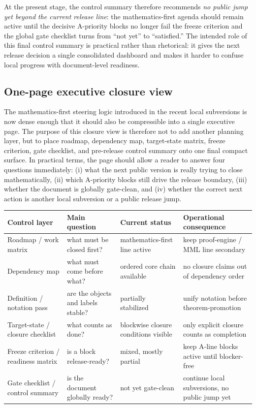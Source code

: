 At the present stage, the control summary therefore recommends \emph{no public jump yet beyond the current release line}: the mathematics-first agenda should remain active until the decisive A-priority blocks no longer fail the freeze criterion and the global gate checklist turns from ``not yet'' to ``satisfied.'' The intended role of this final control summary is practical rather than rhetorical: it gives the next release decision a single consolidated dashboard and makes it harder to confuse local progress with document-level readiness.


\subsection*{One-page executive closure view}
The mathematics-first steering logic introduced in the recent local subversions is now dense enough that it should also be compressible into a single executive page. The purpose of this closure view is therefore not to add another planning layer, but to place roadmap, dependency map, target-state matrix, freeze criterion, gate checklist, and pre-release control summary onto one final compact surface. In practical terms, the page should allow a reader to answer four questions immediately: (i) what the next public version is really trying to close mathematically, (ii) which A-priority blocks still drive the release boundary, (iii) whether the document is globally gate-clean, and (iv) whether the correct next action is another local subversion or a public release jump.

\begin{center}
\begin{tabular}{p{} p{} p{} p{}}
\toprule
\textbf{Control layer} & \textbf{Main question} & \textbf{Current status} & \textbf{Operational consequence}\\
\midrule
Roadmap / work matrix & what must be closed first? & mathematics-first line active & keep proof-engine / MML line secondary\\
Dependency map & what must come before what? & ordered core chain available & no closure claims out of dependency order\\
Definition / notation pass & are the objects and labels stable? & partially stabilized & unify notation before theorem-promotion\\
Target-state / closure checklist & what counts as done? & blockwise closure conditions visible & only explicit closure counts as completion\\
Freeze criterion / readiness matrix & is a block release-ready? & mixed, mostly partial & keep A-line blocks active until blocker-free\\
Gate checklist / control summary & is the document globally ready? & not yet gate-clean & continue local subversions, no public jump yet\\
\bottomrule
\end{tabular}
\end{center}

